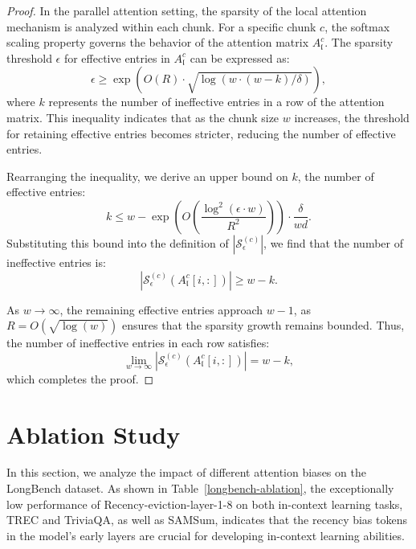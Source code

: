 \begin{proof}
    In the parallel attention setting, the sparsity of the local attention mechanism is analyzed within each chunk. For a specific chunk \( c \), the softmax scaling property governs the behavior of the attention matrix \( A^{c}_\mathfrak{l} \). The sparsity threshold \( \epsilon \) for effective entries in \( A^{c}_\mathfrak{l} \) can be expressed as:
    \[
    \epsilon \geq \exp\left(O(R) \cdot \sqrt{\log(w \cdot (w - k) / \delta)}\right),
    \]
    where \( k \) represents the number of ineffective entries in a row of the attention matrix. This inequality indicates that as the chunk size \( w \) increases, the threshold for retaining effective entries becomes stricter, reducing the number of effective entries.

    Rearranging the inequality, we derive an upper bound on \( k \), the number of effective entries:
    \[
    k \leq w - \exp\left(O\left(\frac{\log^2(\epsilon \cdot w)}{R^2}\right)\right) \cdot \frac{\delta}{wd}.
    \]
    Substituting this bound into the definition of \( |\mathcal{S}_\epsilon^{(c)}| \), we find that the number of ineffective entries is:
    \[
    | \mathcal{S}_\epsilon^{(c)}(A^{c}_\mathfrak{l}[i,:]) | \geq w - k.
    \]

    As \( w \to \infty \), the remaining effective entries approach \( w - 1 \), as \( R = O(\sqrt{\log(w)}) \) ensures that the sparsity growth remains bounded. Thus, the number of ineffective entries in each row satisfies:
    \[
    \lim_{w \to \infty} | \mathcal{S}_\epsilon^{(c)}(A^{c}_\mathfrak{l}[i,:]) | = w - k,
    \]
    which completes the proof.
\end{proof}

\FloatBarrier

\FloatBarrier


\section{Ablation Study}
\label{Ablation Study}

In this section, we analyze the impact of different attention biases on the LongBench dataset. As shown in Table~\ref{longbench-ablation}, the exceptionally low performance of Recency-eviction-layer-1-8 on both in-context learning tasks, TREC and TriviaQA, as well as SAMSum, indicates that the recency bias tokens in the model's early layers are crucial for developing in-context learning abilities. 
